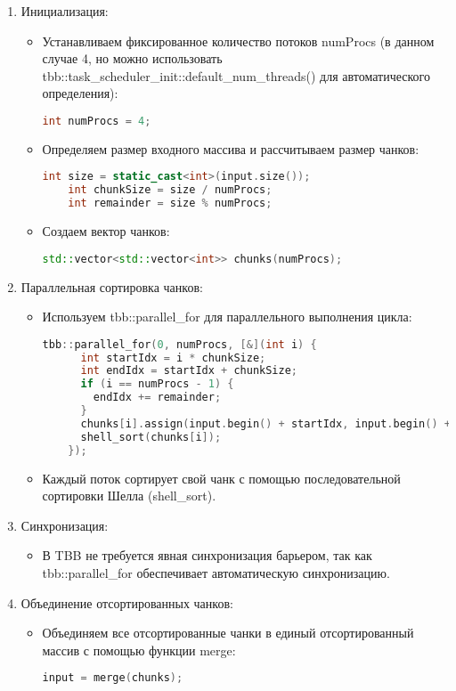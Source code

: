 \documentclass[]{article}
\theoremstyle{remark}
\theoremstyle{definition}
\newcommand{\cpp}{\textit{}}
\begin{document}
\begin{enumerate}
    \item Инициализация:
    \begin{itemize}
        \item Устанавливаем фиксированное количество потоков \cpp{numProcs} (в данном случае 4, но можно использовать \cpp{tbb::task\_scheduler\_init::default\_num\_threads()} для автоматического определения):
        \begin{lstlisting}[language=C++]
    int numProcs = 4;
        \end{lstlisting}

        \item Определяем размер входного массива и рассчитываем размер чанков:
        \begin{lstlisting}[language=C++]
    int size = static_cast<int>(input.size());
    int chunkSize = size / numProcs;
    int remainder = size % numProcs;
        \end{lstlisting}
    
        \item Создаем вектор чанков:
        \begin{lstlisting}[language=C++]
    std::vector<std::vector<int>> chunks(numProcs);
        \end{lstlisting}
    \end{itemize}
    \item Параллельная сортировка чанков:
    \begin{itemize}
        \item Используем \cpp{tbb::parallel\_for} для параллельного выполнения цикла:
        \begin{lstlisting}[language=C++]
    tbb::parallel_for(0, numProcs, [&](int i) {
      int startIdx = i * chunkSize;
      int endIdx = startIdx + chunkSize;
      if (i == numProcs - 1) {
        endIdx += remainder;
      }
      chunks[i].assign(input.begin() + startIdx, input.begin() + endIdx);
      shell_sort(chunks[i]);
    });
        \end{lstlisting}

        \item Каждый поток сортирует свой чанк с помощью последовательной сортировки Шелла (\cpp{shell\_sort}).
    \end{itemize}
    \item Синхронизация:
    \begin{itemize}
        \item В TBB не требуется явная синхронизация барьером, так как \cpp{tbb::parallel\_for} обеспечивает автоматическую синхронизацию.
    \end{itemize}
    \item Объединение отсортированных чанков:
    \begin{itemize}
        \item Объединяем все отсортированные чанки в единый отсортированный массив с помощью функции \cpp{merge}:
        \begin{lstlisting}[language=C++]
        input = merge(chunks);
        \end{lstlisting}
    \end{itemize}
\end{enumerate}
\end{document}
